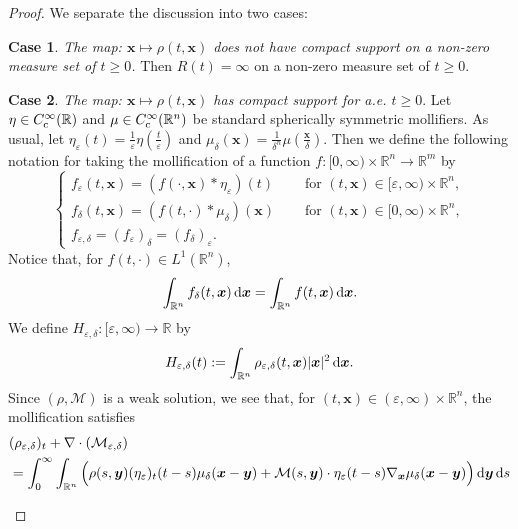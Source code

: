\documentclass[reqno,11pt]{amsart}
\numberwithin{equation}{section}
\theoremstyle{definition}
\newtheorem{case}{Case}
\def\dd{{\, \rm d}}
\begin{document}
\begin{proof} We separate the discussion into two cases:
\begin{case}
{\it The map: $\boldsymbol{x} \mapsto \rho(t,\boldsymbol{x})$ does not have compact support on a non-zero measure 
set of $t \geq 0$.}  Then $R(t) = \infty$ on a non-zero measure set of $t \geq 0$. 
\end{case}
\begin{case}
{\it The map: $\boldsymbol{x} \mapsto \rho(t,\boldsymbol{x})$ has compact support for {\it a.e.} $t \geq 0$}. 
Let $\eta \in C^\infty_{\rm c}(\mathbb{R})$ and $\mu\in C^\infty_{\rm c}(\mathbb{R}^n)$ 
be standard spherically symmetric mollifiers. As usual, 
let $\eta_{\varepsilon}(t) = \frac{1}{{\varepsilon}}\eta(\frac{t}{{\varepsilon}})$ 
and $\mu_{\delta}(\boldsymbol{x}) = \frac{1}{{\delta}^n}\mu(\frac{\boldsymbol{x}}{{\delta}})$. 
Then we define the following notation for taking the mollification of 
a function $f:[0,\infty)\times\mathbb{R}^n \to \mathbb{R}^m$ by
\[
\begin{cases}
    f_{\varepsilon}(t,\boldsymbol{x}) = (f(\cdot,\boldsymbol{x})*\eta_{\varepsilon})(t)&\quad \text{ for } (t,\boldsymbol{x}) \in [{\varepsilon},\infty)\times\mathbb{R}^n, \\
    f_{\delta}(t,\boldsymbol{x}) = (f(t,\cdot)*\mu_{\delta})(\boldsymbol{x})&\quad\text{ for } (t,\boldsymbol{x}) \in [0,\infty)\times\mathbb{R}^n, \\
    f_{{\varepsilon},{\delta}} = (f_{\varepsilon})_{\delta} = (f_{\delta})_{\varepsilon}.
\end{cases}
\]
Notice that, for $f(t,\cdot) \in L^1(\mathbb{R}^n)$, 
\begin{equation}\label{mollme}
\int_{\mathbb{R}^n} f_{\delta}(t,\boldsymbol{x}) \dd \boldsymbol{x} 
= \int_{\mathbb{R}^n} f(t,\boldsymbol{x}) \dd \boldsymbol{x}.
\end{equation}
We define $H_{{\varepsilon},{\delta}}: [{\varepsilon},\infty) \to \mathbb{R}$ by
\[
H_{{\varepsilon},{\delta}}(t) := \int_{\mathbb{R}^n} \rho_{{\varepsilon},{\delta}}(t,\boldsymbol{x}) |\boldsymbol{x}|^2 \dd \boldsymbol{x}.
\]
Since $(\rho,\mathcal{M})$ is a weak solution, we see that, 
for $(t,\boldsymbol{x}) \in ({\varepsilon},\infty)\times\mathbb{R}^n$, 
the mollification satisfies
\begin{equation}\label{mollmass}
    \begin{split}
  &(\rho_{{\varepsilon},{\delta}})_t + \nabla \cdot (\mathcal{M}_{{\varepsilon},{\delta}}) \\
  &= \int^\infty_0 \int_{\mathbb{R}^n} \Big ( \rho(s,\boldsymbol{y}) (\eta_{\varepsilon})_t(t-s) \mu_{\delta}(\boldsymbol{x} - \boldsymbol{y}) + \mathcal{M}(s,\boldsymbol{y}) \cdot \eta_{\varepsilon}(t-s) \nabla_{\boldsymbol{x}} \mu_{\delta}(\boldsymbol{x} - \boldsymbol{y}) \Big ) \dd \boldsymbol{y} \dd s \\

\end{split}
\end{equation}
\end{case}
\end{proof}
\end{document}
